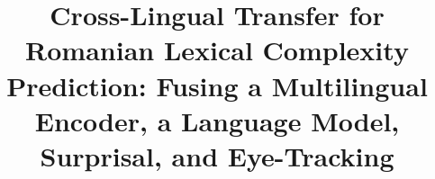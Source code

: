 \usepackage[T1]{fontenc}

\usepackage[utf8]{inputenc}

\usepackage{microtype}

\usepackage{inconsolata}

\usepackage{graphicx}

\usepackage{booktabs}          %
\graphicspath{{figures/}}      %

\renewcommand{\topfraction}{0.9}
\renewcommand{\bottomfraction}{0.5}
\renewcommand{\textfraction}{0.08}
\renewcommand{\floatpagefraction}{0.8}

%
%

\title{Cross-Lingual Transfer for Romanian Lexical Complexity Prediction:
       Fusing a Multilingual Encoder, a Language Model, Surprisal, and
       Eye-Tracking}

